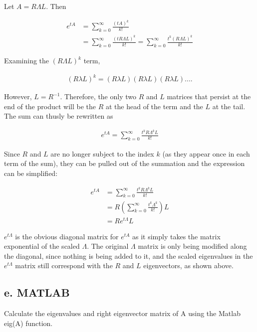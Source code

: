 \documentclass{article}
\begin{document}
		Let $A=R\Lambda L$.  Then
		
		\begin{align*}
			e^{tA}&=\sum_{k=0}^{\infty}\frac{(tA)^k}{k!}\\
			&=\sum_{k=0}^{\infty}\frac{(tR\Lambda L)^k}{k!}=\sum_{k=0}^{\infty}\frac{t^k(R\Lambda L)^k}{k!}
		\end{align*}
		
		Examining the $(R\Lambda L)^k$ term,
		
		\begin{align*}
			(R\lambda L)^{k}=(R\lambda L)(R\lambda L)(R\lambda L)....
		\end{align*}
		
		However, $L=R^{-1}$.  Therefore, the only two $R$ and $L$ matrices that persist at the end of the product will be the $R$ at the head of the term and the $L$ at the tail.  The sum can thusly be rewritten as
		
		\begin{align*}
			e^{tA}=\sum_{k=0}^{\infty}\frac{t^{k}R\Lambda^{k}L}{k!}
		\end{align*}
		
		Since $R$ and $L$ are no longer subject to the index $k$ (as they appear once in each term of the sum), they can be pulled out of the summation and the expression can be simplified:
		
		\begin{align*}
			e^{tA}&=\sum_{k=0}^{\infty}\frac{t^{k}R\Lambda^{k}L}{k!}\\
			&=R(\sum_{k=0}^{\infty}\frac{t^{k}\Lambda^{k}}{k!})L\\
			&=Re^{t\Lambda}L
		\end{align*}
		
		$e^{t\Lambda}$ is the obvious diagonal matrix for $e^{tA}$ as it simply takes the matrix exponential of the scaled $\Lambda$.  The original $\Lambda$ matrix is only being modified along the diagonal, since nothing is being added to it, and the scaled eigenvalues in the $e^{t\Lambda}$ matrix still correspond with the $R$ and $L$ eigenvectors, as shown above.
		
		\newpage
		\subsection{e. MATLAB}
		Calculate the eigenvalues and right eigenvector matrix of A using the Matlab eig(A) function.  
\end{document}
